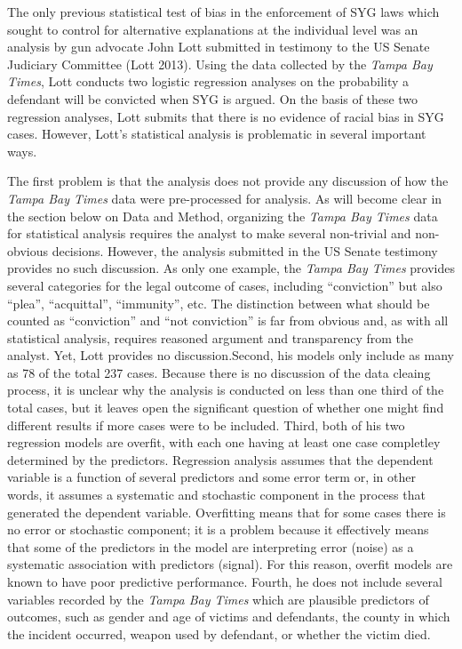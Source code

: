 \documentclass[12pt,article]{article}
\begin{document}
The only previous statistical test of bias in the enforcement of SYG
laws which sought to control for alternative explanations at the
individual level was an analysis by gun advocate John Lott submitted in
testimony to the US Senate Judiciary Committee (Lott 2013). Using the
data collected by the \emph{Tampa Bay Times}, Lott conducts two logistic
regression analyses on the probability a defendant will be convicted
when SYG is argued. On the basis of these two regression analyses, Lott
submits that there is no evidence of racial bias in SYG cases. However,
Lott's statistical analysis is problematic in several important ways.

The first problem is that the analysis does not provide any discussion
of how the \emph{Tampa Bay Times} data were pre-processed for analysis.
As will become clear in the section below on Data and Method, organizing
the \emph{Tampa Bay Times} data for statistical analysis requires the
analyst to make several non-trivial and non-obvious decisions. However,
the analysis submitted in the US Senate testimony provides no such
discussion. As only one example, the \emph{Tampa Bay Times} provides
several categories for the legal outcome of cases, including
``conviction'' but also ``plea'', ``acquittal'', ``immunity'', etc. The
distinction between what should be counted as ``conviction'' and ``not
conviction'' is far from obvious and, as with all statistical analysis,
requires reasoned argument and transparency from the analyst. Yet, Lott
provides no discussion.Second, his models only include as many as 78 of
the total 237 cases. Because there is no discussion of the data cleaing
process, it is unclear why the analysis is conducted on less than one
third of the total cases, but it leaves open the significant question of
whether one might find different results if more cases were to be
included. Third, both of his two regression models are overfit, with
each one having at least one case completley determined by the
predictors. Regression analysis assumes that the dependent variable is a
function of several predictors and some error term or, in other words,
it assumes a systematic and stochastic component in the process that
generated the dependent variable. Overfitting means that for some cases
there is no error or stochastic component; it is a problem because it
effectively means that some of the predictors in the model are
interpreting error (noise) as a systematic association with predictors
(signal). For this reason, overfit models are known to have poor
predictive performance. Fourth, he does not include several variables
recorded by the \emph{Tampa Bay Times} which are plausible predictors of
outcomes, such as gender and age of victims and defendants, the county
in which the incident occurred, weapon used by defendant, or whether the
victim died.
\end{document}
